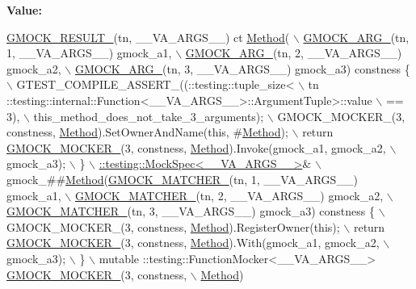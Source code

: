 {\bfseries Value\+:}
\begin{DoxyCode}
\hyperlink{gmock-generated-function-mockers_8h_a0e9d94e9c77df84f1103af06feee1077}{GMOCK\_RESULT\_}(tn, \_\_VA\_ARGS\_\_) ct \hyperlink{gmock-spec-builders__test_8cc_a95606368148f3e5aab5db46c32466afd}{Method}( \(\backslash\)
      \hyperlink{gmock-generated-function-mockers_8h_a887575cc1c31158fba808180a10c004f}{GMOCK\_ARG\_}(tn, 1, \_\_VA\_ARGS\_\_) gmock\_a1, \(\backslash\)
      \hyperlink{gmock-generated-function-mockers_8h_a887575cc1c31158fba808180a10c004f}{GMOCK\_ARG\_}(tn, 2, \_\_VA\_ARGS\_\_) gmock\_a2, \(\backslash\)
      \hyperlink{gmock-generated-function-mockers_8h_a887575cc1c31158fba808180a10c004f}{GMOCK\_ARG\_}(tn, 3, \_\_VA\_ARGS\_\_) gmock\_a3) constness \{ \(\backslash\)
    GTEST\_COMPILE\_ASSERT\_((::testing::tuple\_size<                          \(\backslash\)
        tn ::testing::internal::Function<\_\_VA\_ARGS\_\_>::ArgumentTuple>::value \(\backslash\)
            == 3), \(\backslash\)
        this\_method\_does\_not\_take\_3\_arguments); \(\backslash\)
    GMOCK\_MOCKER\_(3, constness, \hyperlink{gmock-spec-builders__test_8cc_a95606368148f3e5aab5db46c32466afd}{Method}).SetOwnerAndName(\textcolor{keyword}{this}, #\hyperlink{gmock-spec-builders__test_8cc_a95606368148f3e5aab5db46c32466afd}{Method}); \(\backslash\)
    return \hyperlink{gmock-generated-function-mockers_8h_a7d362499e27b1bc3a9806dd3cf58a5b7}{GMOCK\_MOCKER\_}(3, constness, \hyperlink{gmock-spec-builders__test_8cc_a95606368148f3e5aab5db46c32466afd}{Method}).Invoke(gmock\_a1, gmock\_a2, \(\backslash\)
        gmock\_a3); \(\backslash\)
  \} \(\backslash\)
  \hyperlink{classtesting_1_1internal_1_1_mock_spec}{::testing::MockSpec<\_\_VA\_ARGS\_\_>}& \(\backslash\)
      gmock\_##\hyperlink{gmock-spec-builders__test_8cc_a95606368148f3e5aab5db46c32466afd}{Method}(\hyperlink{gmock-generated-function-mockers_8h_aa87d0009fe91f1c89d658776b55a769c}{GMOCK\_MATCHER\_}(tn, 1, \_\_VA\_ARGS\_\_) gmock\_a1, \(\backslash\)
                     \hyperlink{gmock-generated-function-mockers_8h_aa87d0009fe91f1c89d658776b55a769c}{GMOCK\_MATCHER\_}(tn, 2, \_\_VA\_ARGS\_\_) gmock\_a2, \(\backslash\)
                     \hyperlink{gmock-generated-function-mockers_8h_aa87d0009fe91f1c89d658776b55a769c}{GMOCK\_MATCHER\_}(tn, 3, \_\_VA\_ARGS\_\_) gmock\_a3) constness \{ \(\backslash\)
    GMOCK\_MOCKER\_(3, constness, \hyperlink{gmock-spec-builders__test_8cc_a95606368148f3e5aab5db46c32466afd}{Method}).RegisterOwner(\textcolor{keyword}{this}); \(\backslash\)
    return \hyperlink{gmock-generated-function-mockers_8h_a7d362499e27b1bc3a9806dd3cf58a5b7}{GMOCK\_MOCKER\_}(3, constness, \hyperlink{gmock-spec-builders__test_8cc_a95606368148f3e5aab5db46c32466afd}{Method}).With(gmock\_a1, gmock\_a2, \(\backslash\)
        gmock\_a3); \(\backslash\)
  \} \(\backslash\)
  mutable ::testing::FunctionMocker<\_\_VA\_ARGS\_\_> \hyperlink{gmock-generated-function-mockers_8h_a7d362499e27b1bc3a9806dd3cf58a5b7}{GMOCK\_MOCKER\_}(3, constness, \(\backslash\)
      \hyperlink{gmock-spec-builders__test_8cc_a95606368148f3e5aab5db46c32466afd}{Method})
\end{DoxyCode}

